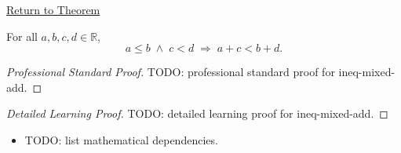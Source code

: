 \newpage
{}
\label{prf:ineq-mixed-add}

\begin{remark*}[Return]
\hyperref[thm:ineq-mixed-add]{Return to Theorem}
\end{remark*}

\begin{theorem*}
For all $a, b, c, d \in \mathbb{R}$,
\[
  a \le b \;\land\; c < d \;\Rightarrow\; a + c < b + d.
\]
\end{theorem*}

\begin{proof}[Professional Standard Proof]
\LRAProofBodyStart
TODO: professional standard proof for ineq-mixed-add.
\end{proof}

\begin{proof}[Detailed Learning Proof]
\LRAProofBodyStart
TODO: detailed learning proof for ineq-mixed-add.
\end{proof}

\begin{remark*}
\end{remark*}

\begin{dependencies}
\begin{itemize}
  \item TODO: list mathematical dependencies.
\end{itemize}
\end{dependencies}

\clearpage
